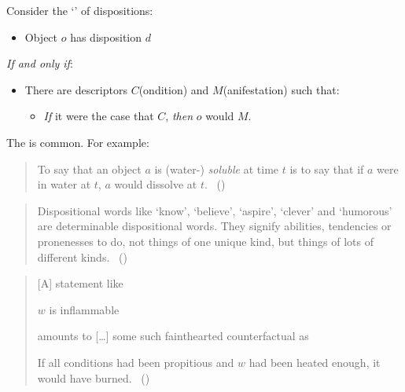 \begin{note}
  Consider the `' of dispositions:%

  \begin{sketch}
    \label{sketch:dBCA}
    \vspace{-\baselineskip}
    \begin{itemize}
    \item
      Object \(o\) has disposition \(d\)
    \end{itemize}
    \emph{If and only if}:
    \begin{itemize}
    \item
      There are descriptors \(C\)(ondition) and \(M\)(anifestation) such that:
      \begin{itemize}
      \item
        \emph{If} it were the case that \(C\), \emph{then} \(o\) would \(M\).
      \end{itemize}
    \end{itemize}
    \vspace{-\baselineskip}
  \end{sketch}

  \noindent%
  The  is common.
  For example:
  \begin{quote}
    To say that an object \(a\) is (water-) \emph{soluble} at time \(t\) is to say that if \(a\) were in water at \(t\), \(a\) would dissolve at \(t\).%
    \mbox{ }\hfill\mbox{(\cite[203]{Quine:2013aa})}
  \end{quote}
  \begin{quote}
    Dispositional words like `know', `believe', `aspire', `clever' and `humorous' are determinable dispositional words.
    They signify abilities, tendencies or pronenesses to do, not things of one unique kind, but things of lots of different kinds.%
    \mbox{ }\hfill\mbox{(\cite[118]{Ryle:1949aa})}
  \end{quote}
  \begin{quote}
    [A] statement like

    \(w\) is inflammable

    amounts to [\dots] some such fainthearted counterfactual as

    If all conditions had been propitious and \(w\) had been heated enough, it would have burned.%
    \mbox{ }\hfill\mbox{(\cite[39]{Goodman:1983aa})}
  \end{quote}
\end{note}


